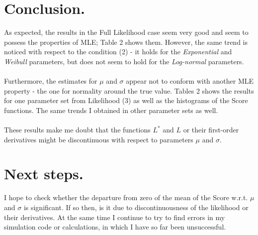 \documentclass{article}
\begin{document}
\section{Conclusion. } As expected, the results in the Full Likelihood case seem very good and seem to possess the properties of MLE; Table 2 shows them. However, the same trend is noticed with respect to the condition (2) - it holds for the \textit{Exponential} and \textit{Weibull} parameters, but does not seem to hold for the \textit {Log-normal} parameters.\\
\\ Furthermore, the estimates for $\mu$ and $\sigma$ appear not to conform with another MLE property - the one for normality around the true value. Tables 2 shows the results for one parameter set from Likelihood (3) as well as the histograms of the Score functions. The same trends I obtained in other parameter sets as well.\\
\\ These results make me doubt that the functions $L^*$ and $L$ or their first-order derivatives might be discontinuous with respect to parameters $\mu$ and $\sigma$. 
\section{Next steps.}
I hope to check whether the departure from zero of the mean of the Score w.r.t. $\mu$ and $\sigma$ is significant. If so then, is it due to discontinuousness of the likelihood or their derivatives. At the same time I continue to try to find errors in my simulation code or calculations, in which I have so far been unsuccessful.
\end{document}
